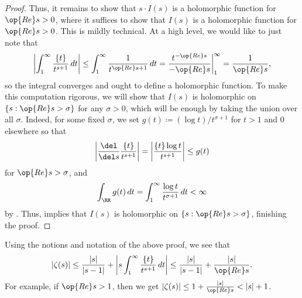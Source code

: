 \documentclass[../notes.tex]{subfiles}
\begin{document}
\begin{proof}
	Thus, it remains to show that $s\cdot I(s)$ is a holomorphic function for $\op{Re}s>0$, where it suffices to show that $I(s)$ is a holomorphic function for $\op{Re}s>0$. This is mildly technical. At a high level, we would like to just note that
	\[\left|\int_1^\infty\frac{\{t\}}{t^{s+1}}\,dt\right|\le\int_1^\infty\frac{1}{t^{\op{Re}s+1}}\,dt=\frac{t^{-\op{Re}s}}{-\op{Re}s}\bigg|_1^\infty=\frac1{\op{Re}s},\]
	so the integral converges and ought to define a holomorphic function. To make this computation rigorous, we will show that $I(s)$ is holomorphic on $\{s:\op{Re}s>\sigma\}$ for any $\sigma>0$, which will be enough by taking the union over all $\sigma$. Indeed, for some fixed $\sigma$, we set $g(t)\coloneqq(\log t)/t^{\sigma+1}$ for $t>1$ and $0$ elsewhere so that
	\[\left|\frac{\del}{\del s}\frac{\{t\}}{t^{s+1}}\right|=\left|\frac{\{t\}\log t}{t^{s+1}}\right|\le g(t)\]
	for $\op{Re}s>\sigma$, and
	\[\int_\RR g(t)\,dt=\int_1^\infty\frac{\log t}{t^{\sigma+1}}\,dt<\infty\]
	by . Thus,  implies that $I(s)$ is holomorphic on $\{s:\op{Re}s>\sigma\}$, finishing the proof.
\end{proof}
\begin{remark} \label{rem:bound-zeta}
	Using the notions and notation of the above proof, we see that
	\[|\zeta(s)|\le\frac{|s|}{|s-1|}+\left|s\int_1^\infty\frac{\{t\}}{t^{s+1}}\,dt\right|\le\frac{|s|}{|s-1|}+\frac{|s|}{\op{Re}s}.\]
	For example, if $\op{Re}s>1$, then we get $|\zeta(s)|\le1+\frac{|s|}{\op{Re}s}<|s|+1$.
\end{remark}
\end{document}
